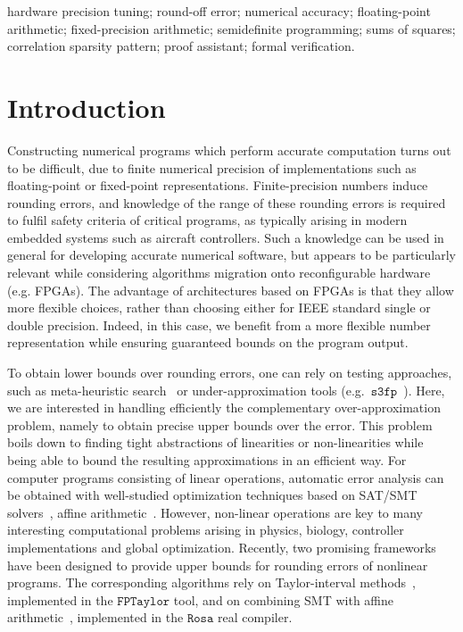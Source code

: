 \documentclass[preprint,fleqn,nocopyrightspace]{sigplanconf}
\newcommand{\sthreefp}{\mathtt{s3fp}}
\newcommand{\rosa}{\mathtt{Rosa}}
\newcommand{\fptaylor}{\mathtt{FPTaylor}}
\theoremstyle{plain}
\begin{document}



\keywords
hardware precision tuning; round-off error; numerical accuracy; floating-point arithmetic; fixed-precision arithmetic; semidefinite programming; sums of squares; correlation sparsity pattern; proof assistant; formal verification.
\section{Introduction} %
\label{sec:intro}
%
Constructing numerical programs which perform accurate computation turns out to be difficult, due to finite numerical precision of implementations such as floating-point or fixed-point representations. Finite-precision numbers induce rounding errors,  and knowledge of the range of these rounding errors is required to fulfil safety criteria of critical programs, as typically arising in modern embedded systems such as aircraft controllers. Such a knowledge can be used in general for developing accurate numerical software, but appears to be particularly relevant while considering algorithms migration onto reconfigurable hardware (e.g. FPGAs). The advantage of architectures based on FPGAs is that they allow more flexible choices, rather than choosing either for IEEE standard single or double precision. Indeed, in this case, we benefit from a more flexible number representation while ensuring guaranteed bounds on the program output. 

To obtain lower bounds over rounding errors, one can rely on testing approaches, such as meta-heuristic search~\cite{Borges12Test} or under-approximation tools (e.g.~$\sthreefp$~\cite{Chiang14s3fp}). Here, we are interested in handling efficiently the complementary over-approximation problem, namely to obtain precise upper bounds over the error. This problem boils down to finding tight abstractions of linearities or non-linearities while being able to bound the resulting approximations in an efficient way.  
%
For computer programs consisting of linear operations, automatic error analysis can be obtained with well-studied optimization techniques based on SAT/SMT solvers~\cite{hgbk2012fmcad}, affine arithmetic~\cite{fluctuat}. However, non-linear operations are key to many interesting computational problems arising in physics, biology, controller implementations and global optimization. 
Recently, two promising frameworks have been designed to provide upper bounds for rounding errors of nonlinear programs. The corresponding algorithms rely on Taylor-interval methods~\cite{fptaylor15}, implemented in the $\fptaylor$ tool, and on combining SMT with affine arithmetic~\cite{Darulova14Popl}, implemented in the $\rosa$ real compiler.
\end{document}
